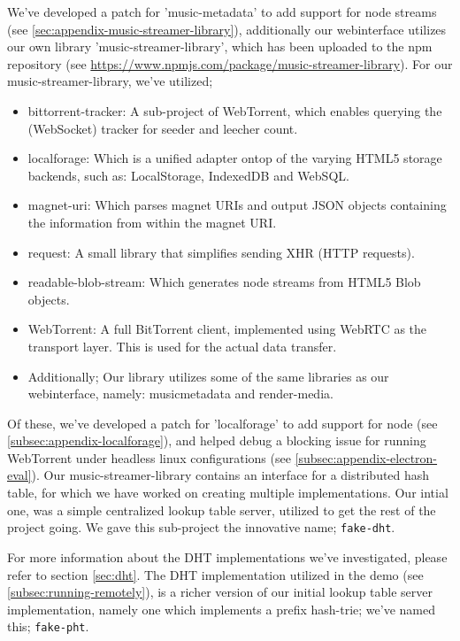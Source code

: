 We've developed a patch for 'music-metadata' to add support for node streams
(see \ref{sec:appendix-music-streamer-library}), additionally our webinterface
utilizes our own library 'music-streamer-library', which has been uploaded to
the npm repository (see \url{https://www.npmjs.com/package/music-streamer-library}).
\newline\newline
For our music-streamer-library, we've utilized;
\begin{itemize}
\item bittorrent-tracker: A sub-project of WebTorrent, which enables querying 
        the (WebSocket) tracker for seeder and leecher count.
\item localforage: Which is a unified adapter ontop of the varying \acs{HTML}5
        storage backends, such as: LocalStorage, IndexedDB and WebSQL.
\item magnet-uri: Which parses magnet URIs and output \acs{JSON} objects containing
        the information from within the magnet URI.
\item request: A small library that simplifies sending XHR (\acs{HTTP} requests).
\item readable-blob-stream: Which generates node streams from \acs{HTML}5 Blob objects.
\item WebTorrent: A full BitTorrent client, implemented using WebRTC as the 
        transport layer. This is used for the actual data transfer.
\item Additionally; Our library utilizes some of the same libraries as our
        webinterface, namely: musicmetadata and render-media.
\end{itemize}
Of these, we've developed a patch for 'localforage' to add support for node
(see \ref{subsec:appendix-localforage}), and helped debug a blocking issue for
running WebTorrent under headless linux configurations (see
\ref{subsec:appendix-electron-eval}).
\newline\newline
Our music-streamer-library contains an interface for a distributed hash table,
for which we have worked on creating multiple implementations. Our intial one,
was a simple centralized lookup table server, utilized to get the rest of the 
project going. We gave this sub-project the innovative name; \verb|fake-dht|.

For more information about the \acs{DHT} implementations we've investigated, please
refer to section \ref{sec:dht}.
\newline\newline
The \acs{DHT} implementation utilized in the demo (see \ref{subsec:running-remotely}),
is a richer version of our initial lookup table server implementation, namely
one which implements a prefix hash-trie; we've named this; \verb|fake-pht|.

